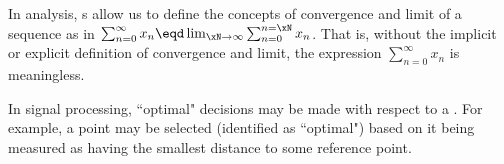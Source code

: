 \begin{enume}
  \item In analysis, s allow us to define the concepts of convergence and limit of a sequence as in
   $\sum_{n=0}^\infty x_n \eqd \lim_{\xN\to\infty}\sum_{n=0}^{n=\xN} x_n$.
   That is, without the implicit or explicit definition of convergence and limit, the expression 
   $\sum_{n=0}^\infty x_n$ is meaningless.

  \item In signal processing, ``optimal" decisions may be made with respect to a .
    For example, a point may be selected (identified as ``optimal") based on it being measured as having the smallest distance
    to some reference point. 
\end{enume}


